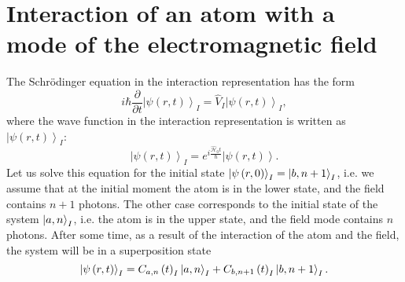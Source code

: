 \section{Interaction of an atom with a mode of the electromagnetic field}
The Schrödinger equation in the interaction representation has the form
\begin{equation}
i \hbar \frac{\partial}{\partial t} \left|\psi\left(r, t\right)\right>_I
= \hat{V}_I \left|\psi\left(r, t\right)\right>_I,
\label{eqCh2_Shredinger_inter}
\end{equation}
 where the wave function in the interaction representation is written as
\(
\left|\psi\left(r, t\right)\right>_I
\):
\begin{equation}
\left|\psi\left(r, t\right)\right>_I = e^{i \frac{\hat{\mathcal{H}}_0
    t}{\hbar}}
\left|\psi\left(r, t\right)\right>.
\label{eqCh2_Psi_inter}
\end{equation}
Let us solve this equation for the initial state 
$\left|\psi\left(r, 0\right)\right>_I = \ket{b, n + 1}_I$, i.e. 
we assume that at the initial moment the atom is in the lower
state, and the field contains $n + 1$ photons. The other case
corresponds to the initial state of the system  
$\ket{a, n}_I$, i.e. the atom is in the upper
state, and the field mode contains $n$ photons. After some time, as a result of the interaction of the atom and the field, the system will be in a
superposition state  
\begin{equation}
\left|\psi\left(r, t\right)\right>_I = 
C_{a,n}\left(t\right)_I\ket{a, n}_I +
C_{b,n+1}\left(t\right)_I\ket{b, n + 1}_I.
\label{eqCh2_OurPsi_inter}
\end{equation}

